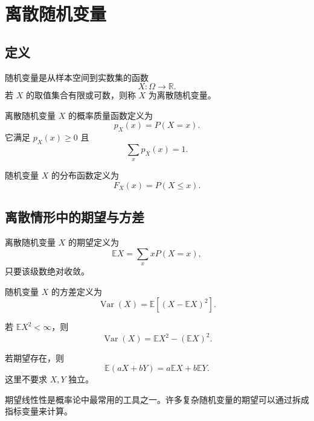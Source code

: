 \section{离散随机变量}

\subsection{定义}

\begin{definition}[离散随机变量]
随机变量是从样本空间到实数集的函数
\[
    X:\Omega\to\mathbb{R}.
\]
若 $X$ 的取值集合有限或可数，则称 $X$ 为离散随机变量。
\end{definition}

\begin{definition}[概率质量函数]
离散随机变量 $X$ 的概率质量函数定义为
\[
    p_X(x)=P(X=x).
\]
它满足 $p_X(x)\ge0$ 且
\[
    \sum_x p_X(x)=1.
\]
\end{definition}

\begin{definition}[分布函数]
随机变量 $X$ 的分布函数定义为
\[
    F_X(x)=P(X\le x).
\]
\end{definition}

\subsection{离散情形中的期望与方差}

\begin{definition}[期望]
离散随机变量 $X$ 的期望定义为
\[
    \mathbb{E}X=\sum_x xP(X=x),
\]
只要该级数绝对收敛。
\end{definition}

\begin{definition}[方差]
随机变量 $X$ 的方差定义为
\[
    \operatorname{Var}(X)=\mathbb{E}\left[(X-\mathbb{E}X)^2\right].
\]
\end{definition}

\begin{proposition}[方差的计算公式]
若 $\mathbb{E}X^2<\infty$，则
\[
    \operatorname{Var}(X)=\mathbb{E}X^2-(\mathbb{E}X)^2.
\]
\end{proposition}

\begin{proposition}[期望的线性性]
若期望存在，则
\[
    \mathbb{E}(aX+bY)=a\mathbb{E}X+b\mathbb{E}Y.
\]
这里不要求 $X,Y$ 独立。
\end{proposition}

\begin{remark}
期望线性性是概率论中最常用的工具之一。许多复杂随机变量的期望可以通过拆成指标变量来计算。
\end{remark}

